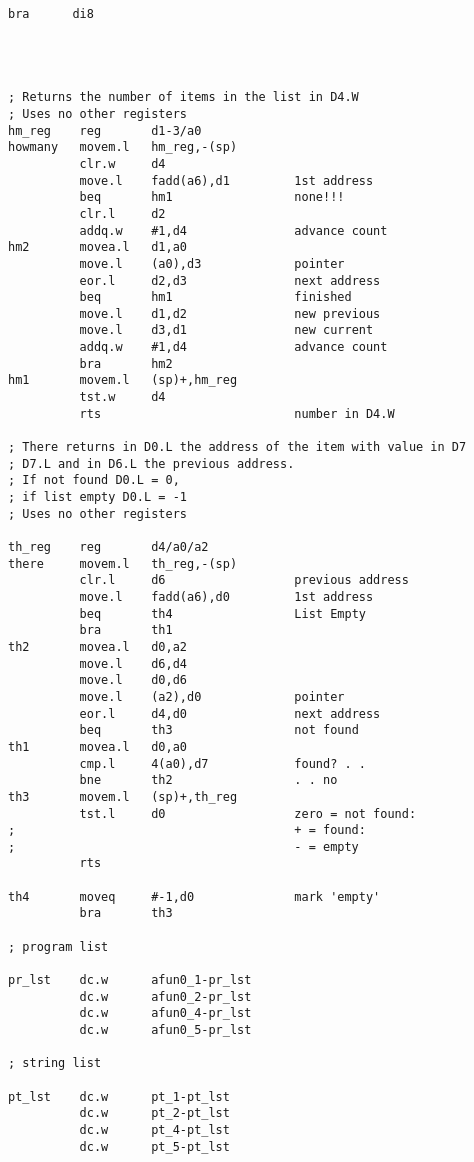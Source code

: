 \begin{lstlisting}[firstnumber=1,caption={George's Linked List Example Program}]
           bra      di8




; Returns the number of items in the list in D4.W
; Uses no other registers
hm_reg    reg       d1-3/a0
howmany   movem.l   hm_reg,-(sp)
          clr.w     d4
          move.l    fadd(a6),d1         1st address
          beq       hm1                 none!!!
          clr.l     d2
          addq.w    #1,d4               advance count
hm2       movea.l   d1,a0
          move.l    (a0),d3             pointer
          eor.l     d2,d3               next address
          beq       hm1                 finished
          move.l    d1,d2               new previous
          move.l    d3,d1               new current
          addq.w    #1,d4               advance count
          bra       hm2
hm1       movem.l   (sp)+,hm_reg
          tst.w     d4
          rts                           number in D4.W

; There returns in D0.L the address of the item with value in D7
; D7.L and in D6.L the previous address. 
; If not found D0.L = 0, 
; if list empty D0.L = -1
; Uses no other registers

th_reg    reg       d4/a0/a2
there     movem.l   th_reg,-(sp)
          clr.l     d6                  previous address
          move.l    fadd(a6),d0         1st address
          beq       th4                 List Empty
          bra       th1
th2       movea.l   d0,a2
          move.l    d6,d4
          move.l    d0,d6
          move.l    (a2),d0             pointer
          eor.l     d4,d0               next address
          beq       th3                 not found
th1       movea.l   d0,a0
          cmp.l     4(a0),d7            found? . .
          bne       th2                 . . no
th3       movem.l   (sp)+,th_reg
          tst.l     d0                  zero = not found: 
;                                       + = found: 
;                                       - = empty
          rts

th4       moveq     #-1,d0              mark 'empty'
          bra       th3

; program list

pr_lst    dc.w      afun0_1-pr_lst
          dc.w      afun0_2-pr_lst
          dc.w      afun0_4-pr_lst
          dc.w      afun0_5-pr_lst

; string list

pt_lst    dc.w      pt_1-pt_lst
          dc.w      pt_2-pt_lst
          dc.w      pt_4-pt_lst
          dc.w      pt_5-pt_lst


\end{lstlisting}
